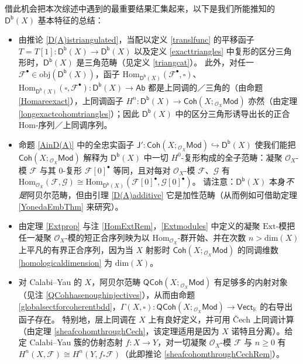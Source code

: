 借此机会把本次综述中遇到的最重要结果汇集起来，以下是我们所能推知的 $\mathsf{D^b}(X)$ 基本特征的总结：

\begin{itemize}[leftmargin=0.5cm]
\item 由推论 \ref{D(A)istriangulated}，当配以定义 \ref{translfunc} 的平移函子 $T=T[1]:\mathsf{D^b}(X)\rightarrow \mathsf{D^b}(X)$ 以及定义 \ref{exacttriangles} 中复形的区分三角形时，$\mathsf{D^b}(X)$ 是三角范畴（见定义 \ref{triangcat}）。
\newline 此外，对任一 $\mathcal{F}^\bullet\in\text{obj}(\mathsf{D^b}(X))$，函子 $\text{Hom}_{\mathsf{D^b}(X)}(\mathcal{F}^\bullet,\square)$、$\text{Hom}_{\mathsf{D^b}(X)}(\square,\mathcal{F}^\bullet):\mathsf{D^b}(X)\rightarrow\mathsf{Ab}$ 都是上同调的／三角的（由命题 \ref{Homareexact}），上同调函子 $H^n:\mathsf{D^b}(X)\rightarrow\mathsf{Coh}(X;{}_{\mathcal{O}_X}\!\mathsf{Mod})$ 亦然（由定理 \ref{longexactcohomtriangles}）；因此 $\mathsf{D^b}(X)$ 中的区分三角形诱导出长的正合 Hom-序列／上同调序列。

\item 命题 \ref{AinD(A)} 中的全忠实函子 $\mathsf{J}':\mathsf{Coh}(X;{}_{\mathcal{O}_X}\!\mathsf{Mod})\hookrightarrow\mathsf{D^b}(X)$ 使我们能把 $\mathsf{Coh}(X;{}_{\mathcal{O}_X}\!\mathsf{Mod})$ 解释为 $\mathsf{D^b}(X)$ 中一切 $H^0$-复形构成的全子范畴：凝聚 $\mathcal{O}_X$-模 $\mathcal{F}$ 与其 0-复形 $\mathcal{F}[0]^\bullet$ 等同，且对每对 $\mathcal{O}_X$-模 $\mathcal{F}$、$\mathcal{G}$ 有 $\text{Hom}_{\mathcal{O}_X}(\mathcal{F},\mathcal{G})\cong\text{Hom}_{\mathsf{D^b}(X)}(\mathcal{F}[0]^\bullet,\mathcal{G}[0]^\bullet)$。
\newline 请注意：$\mathsf{D^b}(X)$ 本身\textit{不是}阿贝尔范畴，但由引理 \ref{D(A)additive} 它是加性范畴（从而例如可借助定理 \ref{YonedaEmbThm} 来研究）。

\item 由定理 \ref{Extprop} 与注 \ref{HomExtRem}，\eqref{Extmodules} 中定义的凝聚 $\text{Ext}$-模把任一凝聚 $\mathcal{O}_X$-模的短正合序列映为以 $\text{Hom}_{\mathcal{O}_X}$-群开始、并在次数 $n>\text{dim}(X)$ 上平凡的有界正合序列，因为当 $X$ 射影时 $\mathsf{Coh}(X;{}_{\mathcal{O}_X}\!\mathsf{Mod})$ 的同调维数 \eqref{homologicaldimension} 为 $\text{dim}(X)$。

\item 对 Calabi--Yau 的 $X$，阿贝尔范畴 $\mathsf{QCoh}(X;{}_{\mathcal{O}_X}\!\mathsf{Mod})$ 有足够多的内射对象（见注 \ref{QCohhasenoughinjectives}），从而由命题 \ref{globalsectforcoherentbdd}，$\Gamma(X,\square):\mathsf{QCoh}(X;{}_{\mathcal{O}_X}\!\mathsf{Mod})\rightarrow \mathsf{Vect}_\mathbb{K}$ 的右导出函子存在。
\newline 特别地，层上同调在 $X$ 上有良好定义，并可用 Čech 上同调计算（由定理 \ref{sheafcohomthroughCech}，该定理适用是因为 $X$ 诺特且分离）。给定 Calabi--Yau 簇的仿射态射 $f:X\rightarrow Y$，对一切凝聚 $\mathcal{O}_X$-模 $\mathcal{F}$ 与 $n\geq 0$ 有 $H^n(X,\mathcal{F})\cong H^n(Y,f_*\mathcal{F})$（此即推论 \ref{sheafcohomthroughCechRem}）。


\end{itemize}
